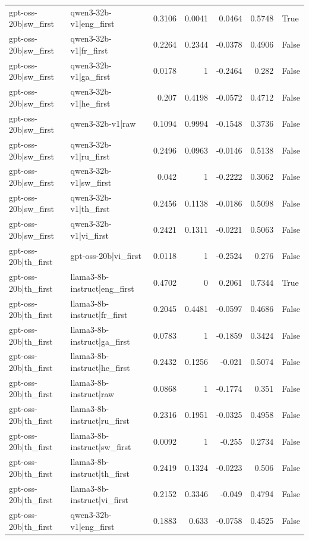 \begin{table}
\begin{tabular}{l l r r r r l}
gpt-oss-20b|sw_first & qwen3-32b-v1|eng_first & 0.3106 & 0.0041 & 0.0464 & 0.5748 & True \\
gpt-oss-20b|sw_first & qwen3-32b-v1|fr_first & 0.2264 & 0.2344 & -0.0378 & 0.4906 & False \\
gpt-oss-20b|sw_first & qwen3-32b-v1|ga_first & 0.0178 & 1 & -0.2464 & 0.282 & False \\
gpt-oss-20b|sw_first & qwen3-32b-v1|he_first & 0.207 & 0.4198 & -0.0572 & 0.4712 & False \\
gpt-oss-20b|sw_first & qwen3-32b-v1|raw & 0.1094 & 0.9994 & -0.1548 & 0.3736 & False \\
gpt-oss-20b|sw_first & qwen3-32b-v1|ru_first & 0.2496 & 0.0963 & -0.0146 & 0.5138 & False \\
gpt-oss-20b|sw_first & qwen3-32b-v1|sw_first & 0.042 & 1 & -0.2222 & 0.3062 & False \\
gpt-oss-20b|sw_first & qwen3-32b-v1|th_first & 0.2456 & 0.1138 & -0.0186 & 0.5098 & False \\
gpt-oss-20b|sw_first & qwen3-32b-v1|vi_first & 0.2421 & 0.1311 & -0.0221 & 0.5063 & False \\
gpt-oss-20b|th_first & gpt-oss-20b|vi_first & 0.0118 & 1 & -0.2524 & 0.276 & False \\
gpt-oss-20b|th_first & llama3-8b-instruct|eng_first & 0.4702 & 0 & 0.2061 & 0.7344 & True \\
gpt-oss-20b|th_first & llama3-8b-instruct|fr_first & 0.2045 & 0.4481 & -0.0597 & 0.4686 & False \\
gpt-oss-20b|th_first & llama3-8b-instruct|ga_first & 0.0783 & 1 & -0.1859 & 0.3424 & False \\
gpt-oss-20b|th_first & llama3-8b-instruct|he_first & 0.2432 & 0.1256 & -0.021 & 0.5074 & False \\
gpt-oss-20b|th_first & llama3-8b-instruct|raw & 0.0868 & 1 & -0.1774 & 0.351 & False \\
gpt-oss-20b|th_first & llama3-8b-instruct|ru_first & 0.2316 & 0.1951 & -0.0325 & 0.4958 & False \\
gpt-oss-20b|th_first & llama3-8b-instruct|sw_first & 0.0092 & 1 & -0.255 & 0.2734 & False \\
gpt-oss-20b|th_first & llama3-8b-instruct|th_first & 0.2419 & 0.1324 & -0.0223 & 0.506 & False \\
gpt-oss-20b|th_first & llama3-8b-instruct|vi_first & 0.2152 & 0.3346 & -0.049 & 0.4794 & False \\
gpt-oss-20b|th_first & qwen3-32b-v1|eng_first & 0.1883 & 0.633 & -0.0758 & 0.4525 & False \\

\end{tabular}
\end{table}
